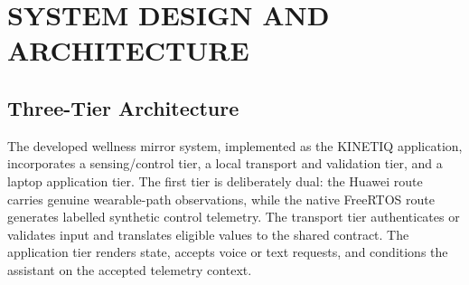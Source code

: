 \chapter{SYSTEM DESIGN AND ARCHITECTURE}

\section{Three-Tier Architecture}
The developed wellness mirror system, implemented as the KINETIQ application, incorporates a sensing/control tier, a local transport and validation tier, and a laptop application tier. The first tier is deliberately dual: the Huawei route carries genuine wearable-path observations, while the native FreeRTOS route generates labelled synthetic control telemetry. The transport tier authenticates or validates input and translates eligible values to the shared contract. The application tier renders state, accepts voice or text requests, and conditions the assistant on the accepted telemetry context.

